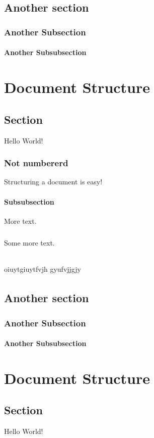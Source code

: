 \documentclass{book}
\begin{document}
	\subparagraph{}
	\lipsum[1]
	\section{Another section}
	\subsection{Another Subsection}
	\subsubsection{Another Subsubsection}
	\lipsum[1-3]\chapter{Document Structure}
	\section{Section}
	Hello World!
	\subsection*{Not numbererd}
	Structuring a document is easy!
	\subsubsection{Subsubsection}
	More text.
	\paragraph{}
	Some more text.
	\subparagraph{}
	oiuytgiuytfvjh gyufvjjgjy
	
	\subparagraph{}
	\lipsum[1]
	\section{Another section}
	\subsection{Another Subsection}
	\subsubsection{Another Subsubsection}
	\lipsum[1-3]\chapter{Document Structure}
	\section{Section}
	Hello World!
\end{document}
